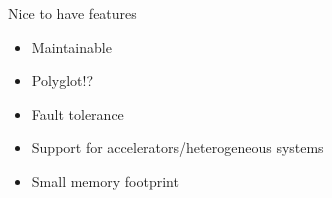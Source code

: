 \documentclass[
14pt,
aspectratio=169,
usenames,
dvipsnames,
x11names]{beamer}
\begin{document}
\begin{frame}{Nice to have features}
  \begin{itemize}  \setlength{\itemsep}{\fill}
  \item Maintainable
  \item Polyglot!?
  \item Fault tolerance
  \item Support for accelerators/heterogeneous systems
  \item Small memory footprint
  \end{itemize}
\end{frame}


\end{document}
